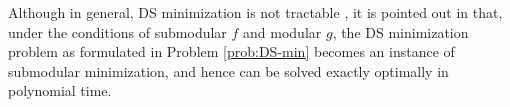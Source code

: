 

Although in general, DS minimization is not tractable \cite{iyer2012algorithms}, it is pointed out in \cite{bai2016algorithms} that, under the conditions of submodular $ f $ and modular $ g $, the DS minimization problem as formulated in Problem \ref{prob:DS-min} becomes an instance of submodular minimization, and hence can be solved exactly optimally in polynomial time.


